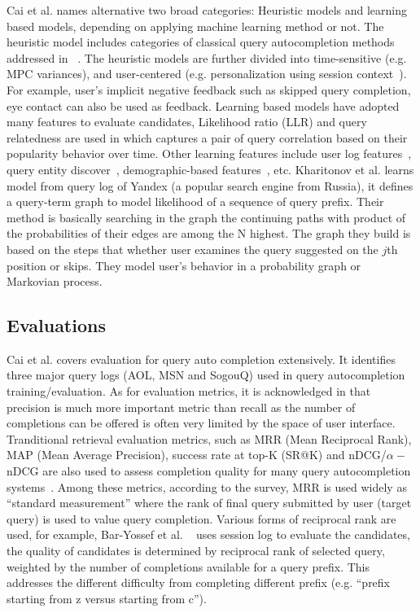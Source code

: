 \documentclass[12pt]{article} %
\begin{document}
Cai et al. \cite{cai_survey_2016} names alternative two broad categories: Heuristic models and learning based models, depending on applying machine learning method or not.
The heuristic model includes categories of classical query autocompletion methods addressed in ~\cite{di_santo_comparing_2015}.
The heuristic models are further divided into time-sensitive (e.g. MPC variances), and user-centered (e.g. personalization using session context~\cite{schmidt_context_sensitive_2016}).
For example, user's implicit negative feedback such as skipped query completion, eye contact can also be used as feedback.
Learning based models have adopted many features to evaluate candidates, Likelihood ratio (LLR) and query relatedness are used in \cite{chien_semantic_2005} which captures a pair of query correlation based on their popularity behavior over time. Other learning features include user log features~\cite{kharitonov_user_2013}, query entity discover~\cite{guo_named_2009}, demographic-based features~\cite{shokouhi_learning_2013}, etc.
Kharitonov et al. \cite{kharitonov_user_2013} learns model from query log of Yandex (a popular search engine from Russia),
it defines a query-term graph to model likelihood of a sequence of query prefix. Their
method is basically searching in the graph the continuing paths with product of
the probabilities of their edges are among the N highest.
The graph they build is based on the steps that whether user examines the query suggested on the $j$th position or skips. They model user's behavior in a probability graph or Markovian process.

\subsection{Evaluations}
Cai et al. \cite{cai_survey_2016} covers evaluation for query auto completion extensively.
It identifies three major query logs (AOL, MSN and SogouQ) used in query autocompletion training/evaluation.
As for evaluation metrics, 
it is acknowledged in \cite{bhatia_query_2011} that precision is much more important metric than recall as the number of completions can be offered is often very limited by the space of user interface.
Tranditional retrieval evaluation metrics, such as MRR (Mean Reciprocal Rank),  MAP (Mean Average Precision), success rate at top-K (SR@K) and nDCG/$\alpha-$nDCG are also used to assess completion quality for many query autocompletion systems~\cite{cai_survey_2016}.
Among these metrics, according to the survey, MRR is used widely as ``standard measurement'' where the rank of final query submitted by user (target query) is used to value query completion.
Various forms of reciprocal rank are used, for example, 
Bar-Yossef et al. ~\cite{bar-yossef_context-sensitive_2011} uses session log to evaluate the candidates, the quality of candidates is determined by reciprocal rank
of selected query, weighted by the number of completions available for a query prefix. This addresses the different difficulty from completing different prefix (e.g. ``prefix starting from z versus starting from c'').
\end{document}

